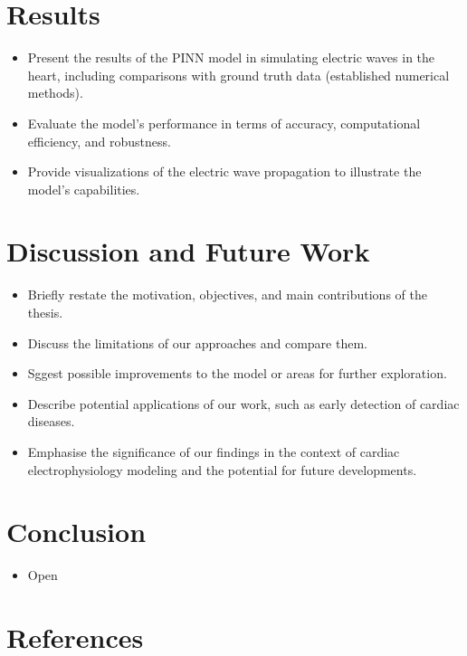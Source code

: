 \documentclass{article}
\begin{document}
\section{Results}
\begin{itemize}
    \item Present the results of the PINN model in simulating electric waves in the heart, including comparisons with ground truth data (established numerical methods).
    \item Evaluate the model's performance in terms of accuracy, computational efficiency, and robustness.
    \item Provide visualizations of the electric wave propagation to illustrate the model's capabilities.
\end{itemize}

\section{Discussion and Future Work}
\begin{itemize}
    \item Briefly restate the motivation, objectives, and main contributions of the thesis.
    \item Discuss the limitations of our approaches and compare them.
    \item Sggest possible improvements to the model or areas for further exploration.
    \item Describe potential applications of our work, such as early detection of cardiac diseases.
    \item Emphasise the significance of our findings in the context of cardiac electrophysiology modeling and the potential for future developments.
\end{itemize}

\section{Conclusion}
\begin{itemize}
    \item Open
\end{itemize}

\section{References}
\end{document}
